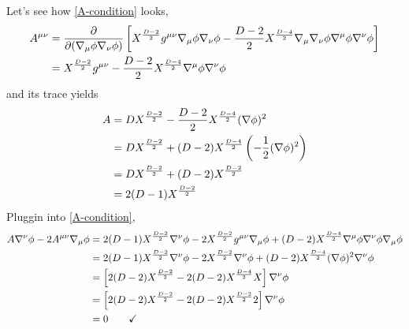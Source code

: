 \begin{ej}
Let's see how \eqref{A-condition} looks,
\begin{align}
  A^{\mu\nu }&=\pdv{(\nabla_\mu\phi\nabla_\nu\phi)}\left[X^{\frac{D-2}{2}}g^{\mu\nu }\nabla_\mu\phi \nabla_\nu\phi  -\frac{D-2}{2}X^{\frac{D-4}{2}}\nabla_\mu \nabla_\nu \phi\nabla^\mu \phi\nabla^\nu \phi \right]\\
  &=X^{\frac{D-2}{2}}g^{\mu\nu }-\frac{D-2}{2}X^{\frac{D-4}{2}}\nabla^\mu \phi \nabla^\nu\phi 
\end{align}
and its trace yields
\begin{align}
  A&=DX^{\frac{D-2}{2}}-\frac{D-2}{2}X^{\frac{D-4}{2}}(\nabla\phi )^2\\
  &=DX^{\frac{D-2}{2}}+(D-2)X^{\frac{D-4}{2}}\left(-\frac{1}{2}(\nabla\phi )^2\right)\\
  &=DX^{\frac{D-2}{2}}+(D-2)X^{\frac{D-2}{2}}\\
  &=2(D-1)X^{\frac{D-2}{2}}
\end{align}
Pluggin into \eqref{A-condition},
\begin{align*}
  A\nabla^\nu \phi-2A^{\mu\nu }\nabla_\mu \phi&=2(D-1)X^{\frac{D-2}{2}}\nabla^\nu\phi -2X^{\frac{D-2}{2}}g^{\mu\nu }\nabla_\mu \phi +(D-2)X^{\frac{D-4}{2}}\nabla^\mu\phi \nabla^\nu\phi \nabla_\mu\phi \\
  &=2(D-1)X^{\frac{D-2}{2}}\nabla^\nu\phi-2X^{\frac{D-2}{2}}\nabla^\nu\phi +(D-2)X^{\frac{D-4}{2}}(\nabla\phi )^2\nabla^\nu\phi \\
  &=\left[2(D-2)X^{\frac{D-2}{2}}-2(D-2)X^{\frac{D-4}{2}}X\right]\nabla^\nu\phi \\
  &=\left[2(D-2)X^{\frac{D-2}{2}}-2(D-2)X^{\frac{D-2}{2}}2\right]\nabla^\nu\phi \\
  &=0\qquad \checkmark
\end{align*}
\end{ej}



